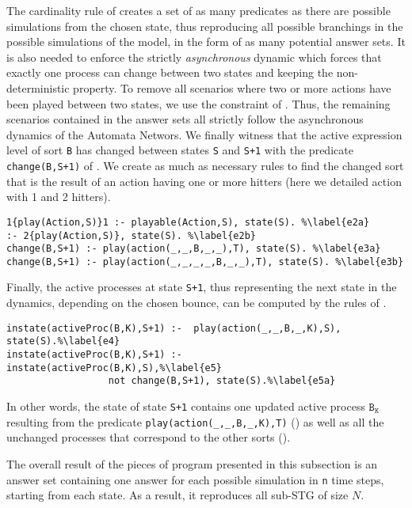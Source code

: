 The cardinality rule of 
creates a set of as many predicates as there are possible simulations from the chosen state,
thus reproducing all possible branchings in the possible simulations of the model, in the form of as many potential answer sets. It is also needed to enforce the strictly \emph{asynchronous} dynamic
which forces that exactly one process can change between two states and keeping the non-deterministic property.
To remove all scenarios where two or more actions have been played between
two states, we use the constraint of .
Thus, the remaining scenarios contained in the answer sets all strictly follow
the asynchronous dynamics of the Automata Networs.
We finally witness that the active expression level of sort \texttt{B} has changed between states \texttt{S} and \texttt{S+1} with the predicate \texttt{change(B,S+1)} of . We create as much as necessary rules to find the changed sort that is the result of an action having one or more hitters (here we detailed action with 1 and 2 hitters).

\begin{lstlisting}
1{play(Action,S)}1 :- playable(Action,S), state(S). %\label{e2a} 
:- 2{play(Action,S)}, state(S). %\label{e2b}
change(B,S+1) :- play(action(_,_,B,_,_),T), state(S). %\label{e3a}
change(B,S+1) :- play(action(_,_,_,_,B,_,_),T), state(S). %\label{e3b}
\end{lstlisting}

Finally, the active processes at state \texttt{S+1},
thus representing the next state in the dynamics, depending on the chosen bounce,
can be computed by the rules of .
\begin{lstlisting}
instate(activeProc(B,K),S+1) :-  play(action(_,_,B,_,K),S), state(S).%\label{e4}
instate(activeProc(B,K),S+1) :-  instate(activeProc(B,K),S),%\label{e5}
				  not change(B,S+1), state(S).%\label{e5a}
\end{lstlisting}
In other words, the state of state \texttt{S+1} contains one updated active process $\texttt{B}_\texttt{K}$
resulting from the predicate \texttt{play(action(\_,\_,B,\_,K),T)} ()
as well as all the unchanged processes that correspond to the other sorts ().

The overall result of the pieces of program presented in this subsection
is an answer set containing one answer for each
possible simulation in \texttt{n} time steps,
starting from each state.
As a result, it reproduces all sub-STG of size $N$.

